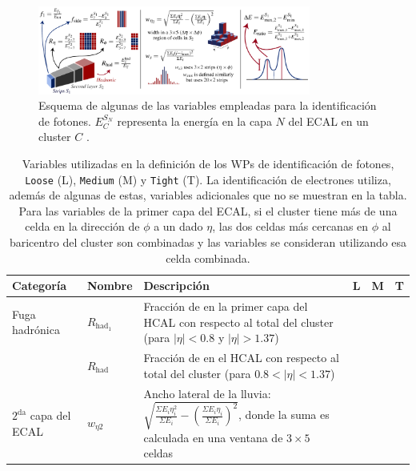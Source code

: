 \begin{figure}
  \centering
  \includegraphics[width=0.8\textwidth]{images/objects/shower_shapes.png}
  \caption{Esquema de algunas de las variables empleadas para la identificación de fotones. $E_C^{S_N}$ representa la energía en la capa $N$ del ECAL en un cluster $C$ \cite{PERF-2017-02}.}
  \label{fig:shower_shapes}
\end{figure}


\begin{table}
\centering 
\caption{Variables utilizadas en la definición de los WPs de identificación de fotones, \texttt{Loose} (L), \texttt{Medium} (M) y \texttt{Tight} (T). La identificación de electrones utiliza, además de algunas de estas, variables adicionales que no se muestran en la tabla. Para las variables de la primer capa del ECAL, si el cluster tiene más de una celda en la dirección de $\phi$ a un dado $\eta$, las dos celdas más cercanas en $\phi$ al baricentro del cluster son combinadas y las variables se consideran utilizando esa celda combinada.}
	\begin{tabular}{ p{2.1cm} l p{8cm} c c c}

  \hline
  \hline

		Categoría & Nombre & Descripción & L & M & T \\

		\hline
		\hline

		Fuga hadrónica & $R_{\text{had}_{1}}$ & Fracción de \ET en la primer capa del HCAL con respecto al \ET total del cluster (para $|\eta|<0.8$ y $|\eta|>1.37$) & \cmark & \cmark & \cmark\\

		 & $R_{\text{had}}$ & Fracción de \ET en el HCAL con respecto al \ET total del cluster (para $0.8<|\eta|<1.37$) & \cmark & \cmark & \cmark \\

		\hline
		
		$2^{\text{da}}$ capa del ECAL   & $w_{\eta 2}$ & Ancho lateral de la lluvia: $\sqrt{\frac{\Sigma E_{i}\eta_{i}^{2}}{\Sigma E_{i}}-(\frac{\Sigma E_{i}\eta_{i}}{\Sigma E_{i}})^{2}}$, donde la suma es calculada en una ventana de $3\times5$ celdas & \cmark & \cmark & \cmark \\


\end{tabular}
\end{table}
